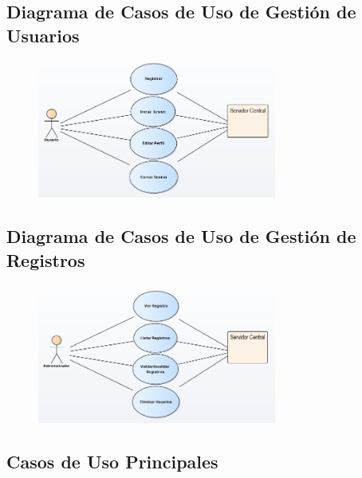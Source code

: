 	\subsection{Diagrama de Casos de Uso de Gestión de Usuarios}

	\begin{figure}[H]
	\centering
		\includegraphics[width=0.7\textwidth]{imagenes/analisis/casos-uso-usuario.png}
		\label{fig:casos-de-uso-usuario}
	\end{figure}

	\subsection{Diagrama de Casos de Uso de Gestión de Registros}

	\begin{figure}[H]
	\centering
		\includegraphics[width=0.7\textwidth]{imagenes/analisis/casos-uso-registros.png}
		\label{fig:casos-de-uso-tienda}
	\end{figure}

	\subsection{Casos de Uso Principales}

